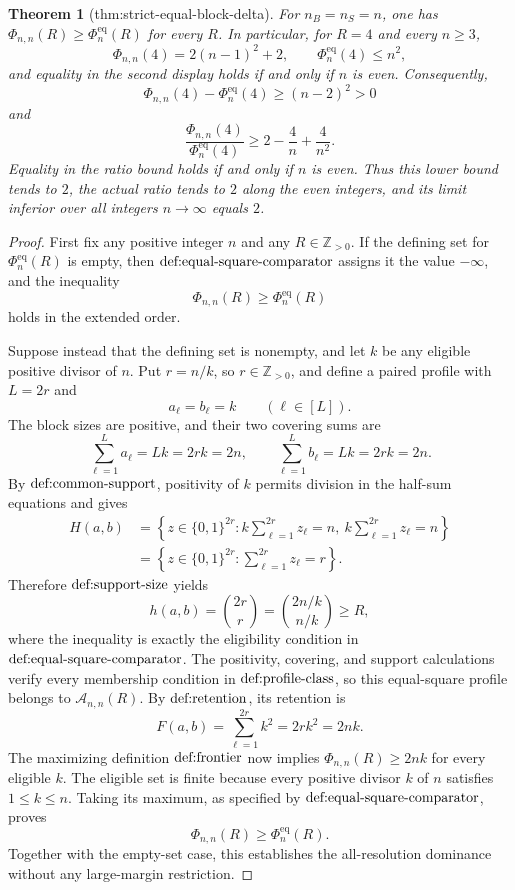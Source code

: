 \documentclass{article}
\newtheorem{theorem}{Theorem}
\begin{document}
\begin{theorem}[thm:strict-equal-block-delta]\label{thm:strict-equal-block-delta}
For \(n_B=n_S=n\), one has \(\Phi_{n,n}(R)\ge \Phi_n^{\mathrm{eq}}(R)\) for every \(R\). In particular, for \(R=4\) and every \(n\ge3\),
\[
\Phi_{n,n}(4)=2(n-1)^2+2,
\qquad
\Phi_n^{\mathrm{eq}}(4)\le n^2,
\]
and equality in the second display holds if and only if \(n\) is even. Consequently,
\[
\Phi_{n,n}(4)-\Phi_n^{\mathrm{eq}}(4)\ge (n-2)^2>0
\]
and
\[
\frac{\Phi_{n,n}(4)}{\Phi_n^{\mathrm{eq}}(4)}
\ge 2-\frac4n+\frac4{n^2}.
\]
Equality in the ratio bound holds if and only if \(n\) is even. Thus this lower bound tends to \(2\), the actual ratio tends to \(2\) along the even integers, and its limit inferior over all integers \(n\to\infty\) equals \(2\).
\end{theorem}
\begin{proof}
First fix any positive integer \(n\) and any \(R\in\mathbb Z_{>0}\). If the defining set for \(\Phi_n^{\mathrm{eq}}(R)\) is empty, then \(\textnormal{def:equal-square-comparator}\) assigns it the value \(-\infty\), and the inequality
\[
\Phi_{n,n}(R)\ge\Phi_n^{\mathrm{eq}}(R)
\]
holds in the extended order.

Suppose instead that the defining set is nonempty, and let \(k\) be any eligible positive divisor of \(n\). Put \(r=n/k\), so \(r\in\mathbb Z_{>0}\), and define a paired profile with \(L=2r\) and
\[
a_\ell=b_\ell=k\qquad(\ell\in[L]).
\]
The block sizes are positive, and their two covering sums are
\[
\sum_{\ell=1}^{L}a_\ell=Lk=2rk=2n,
\qquad
\sum_{\ell=1}^{L}b_\ell=Lk=2rk=2n.
\]
By \(\textnormal{def:common-support}\), positivity of \(k\) permits division in the half-sum equations and gives
\[
\begin{aligned}
H(a,b)
&=\left\{z\in\{0,1\}^{2r}:k\sum_{\ell=1}^{2r}z_\ell=n,\ k\sum_{\ell=1}^{2r}z_\ell=n\right\}\\
&=\left\{z\in\{0,1\}^{2r}:\sum_{\ell=1}^{2r}z_\ell=r\right\}.
\end{aligned}
\]
Therefore \(\textnormal{def:support-size}\) yields
\[
h(a,b)=\binom{2r}{r}=\binom{2n/k}{n/k}\ge R,
\]
where the inequality is exactly the eligibility condition in \(\textnormal{def:equal-square-comparator}\). The positivity, covering, and support calculations verify every membership condition in \(\textnormal{def:profile-class}\), so this equal-square profile belongs to \(\mathcal A_{n,n}(R)\). By \(\textnormal{def:retention}\), its retention is
\[
F(a,b)=\sum_{\ell=1}^{2r}k^2=2rk^2=2nk.
\]
The maximizing definition \(\textnormal{def:frontier}\) now implies \(\Phi_{n,n}(R)\ge2nk\) for every eligible \(k\). The eligible set is finite because every positive divisor \(k\) of \(n\) satisfies \(1\le k\le n\). Taking its maximum, as specified by \(\textnormal{def:equal-square-comparator}\), proves
\[
\Phi_{n,n}(R)\ge\Phi_n^{\mathrm{eq}}(R).
\]
Together with the empty-set case, this establishes the all-resolution dominance without any large-margin restriction.


\end{proof}
\end{document}
